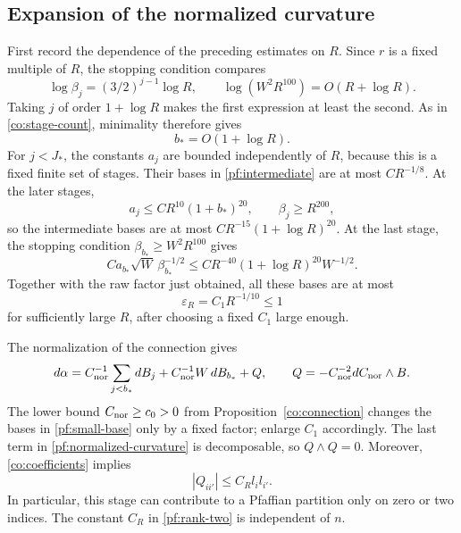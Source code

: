 \subsection{Expansion of the normalized curvature}

First record the dependence of the preceding estimates on $R$.
Since $r$ is a fixed multiple of $R$, the stopping condition compares
\[
 \log\beta_j=(3/2)^{j-1}\log R,
 \qquad
 \log(W^2R^{100})=O(R+\log R).
\]
Taking $j$ of order $1+\log R$ makes the first expression at least
the second.  As in \eqref{co:stage-count}, minimality therefore gives
\begin{equation}
 b_*=O(1+\log R).
 \label{pf:stage-count}
\end{equation}
For $j<J_*$, the constants $a_j$ are bounded independently of $R$,
because this is a fixed finite set of stages.  Their bases in
\eqref{pf:intermediate} are at most $CR^{-1/8}$.  At the later
stages,
\[
 a_j\le CR^{10}(1+b_*)^{20},
 \qquad \beta_j\ge R^{200},
\]
so the intermediate bases are at most
$CR^{-15}(1+\log R)^{20}$.  At the last stage, the stopping condition
$\beta_{b_*}\ge W^2R^{100}$ gives
\[
 Ca_{b_*}\sqrt W\,\beta_{b_*}^{-1/2}
 \le CR^{-40}(1+\log R)^{20}W^{-1/2}.
\]
Together with the raw factor just obtained, all these bases are at
most
\begin{equation}
 \varepsilon_R=C_1R^{-1/10}\le1
 \label{pf:small-base}
\end{equation}
for sufficiently large $R$, after choosing a fixed $C_1$ large enough.

The normalization of the connection gives
\begin{equation}
 d\alpha=C_{\rm nor}^{-1}\sum_{j<b_*}dB_j
       +C_{\rm nor}^{-1}W\,dB_{b_*}+Q,
 \qquad
 Q=-C_{\rm nor}^{-2}dC_{\rm nor}\wedge B.
 \label{pf:normalized-curvature}
\end{equation}
The lower bound $C_{\rm nor}\ge c_0>0$ from
Proposition~\ref{co:connection} changes the bases in
\eqref{pf:small-base} only by a fixed factor; enlarge $C_1$
accordingly.  The last term in \eqref{pf:normalized-curvature} is
decomposable, so $Q\wedge Q=0$.  Moreover,
\eqref{co:coefficients} implies
\begin{equation}
 |Q_{ii'}|\le C_Rl_i l_{i'}.
 \label{pf:rank-two}
\end{equation}
In particular, this stage can contribute to a Pfaffian partition
only on zero or two indices.  The constant $C_R$ in
\eqref{pf:rank-two} is independent of $n$.

